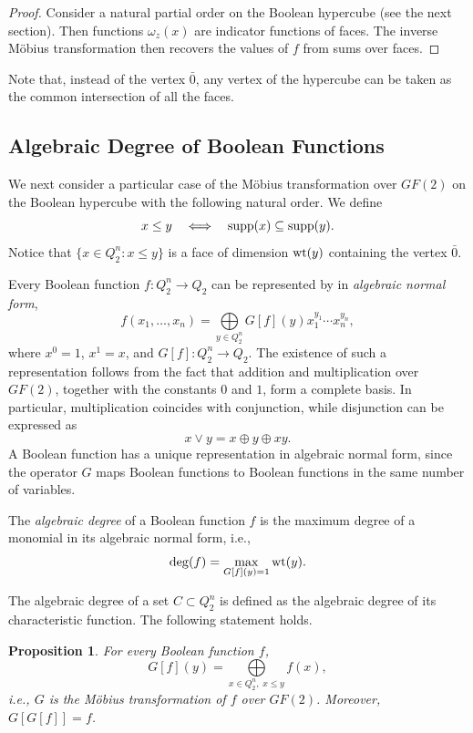 \documentclass[11pt]{article}
\newtheorem{claim}{Proposition}[section]
\theoremstyle{definition}
\newcommand{\supp}{{\rm supp}}
\newcommand{\wt}{{\rm wt}}
\begin{document}
{{{\begin{proof}
Consider a natural partial order on the Boolean hypercube (see the next section). Then functions $\omega_z(x)$ are indicator functions of faces. The inverse Möbius
transformation then recovers the values of $f$ from  sums over faces.
\end{proof}

Note that, instead of the vertex $\bar 0$, any vertex of the
hypercube can be taken as the common intersection of all the faces.


\subsection{Algebraic Degree of  Boolean Functions}

We next consider a particular case of the Möbius transformation over
$GF(2)$ on the Boolean hypercube with the following natural order.  We define
\[
x\leq y\quad\Longleftrightarrow\quad
\supp(x)\subseteq\supp(y).
\]
Notice that $\{x\in Q_2^n:x\leq y\}$
is a face of dimension $\wt(y)$ containing the vertex $\bar 0$.

Every Boolean function $f:Q_2^n\rightarrow Q_2$ can be represented by 
in {\sl algebraic normal
form},
\begin{equation}\label{eqZhegal}
f(x_1,\dots,x_n)=\bigoplus\limits_{y\in Q_2^n}G[f](y)
x_1^{y_1}\cdots x_n^{y_n},
\end{equation}
where $x^0=1$, $x^1=x$, and
$G[f]:Q_2^n\rightarrow Q_2$.
The existence of such a representation follows from the fact that
addition and multiplication over $GF(2)$, together with the constants
$0$ and $1$, form a complete basis. In particular, multiplication
coincides with conjunction, while disjunction can be expressed as
\[
x\vee y=x\oplus y\oplus xy.
\]
A Boolean function has a unique representation in algebraic normal
form, since the operator $G$ maps Boolean functions to Boolean
functions in the same number of variables.

The {\sl algebraic degree} of a Boolean function $f$ is the maximum
degree of a monomial in its algebraic normal form, i.e.,
\[
\deg(f)=\max_{G[f](y)=1}\wt(y).
\]

The algebraic degree of a set $C\subset Q_2^n$ is defined as the
algebraic degree of its characteristic function. 
The following statement holds.

\begin{claim}\label{stsp0}
For every Boolean function $f$,
\[
G[f](y)=\bigoplus\limits_{x\in Q_2^n,\;x\leq y}f(x),
\]
i.e., $G$ is the Möbius transformation of $f$ over $GF(2)$.
Moreover,
$G[G[f]]=f$.
\end{claim}

}}}
\end{document}
